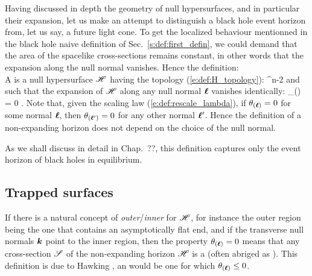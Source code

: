 {{Having discussed in depth the geometry of null hypersurfaces, and in particular
their expansion, let us make an attempt to distinguish a black hole event
horizon from, let us say, a future light cone.
To get the localized behaviour mentionned in the black hole naive definition
of Sec.~\ref{s:def:first_defin}, we could demand that the area of the
spacelike cross-sections remains constant, in other words that
the expansion along the null normal vanishes. Hence the definition:\\
A  is a null hypersurface $\mathscr{H}$ having the
topology (\ref{e:def:H_topology}):
\be
    \Hor \simeq \R \times {}^{n-2}
\ee
and such that the expansion of $\mathscr{H}$ along any null normal $\bm{\ell}$ vanishes
identically:
\be
    \theta_{(\wl)} = 0 .
\ee
Note that, given the scaling law (\ref{e:def:rescale_lambda}),
if $\theta_{(\bm{\ell})} = 0$ for some normal $\bm{\ell}$, then  $\theta_{(\bm{\ell}')} = 0$
for any other normal $\bm{\ell}'$. Hence the definition of a non-expanding horizon
does not depend on the choice of the null normal.

As we shall discuss in detail in Chap.~??, this definition captures only
the event horizon of black holes in equilibrium.

\subsection{Trapped surfaces}

If there is a natural concept of \emph{outer}/\emph{inner} for $\mathscr{H}$, for
instance the outer region being the one that contains an asymptotically flat end,
and if the transverse null normals $\bm{k}$ point to the inner region, then
the property $\theta_{(\bm{\ell})}=0$ means that any cross-section $\mathscr{S}$ of the
non-expanding horizon $\mathscr{H}$ is a
(often abriged as ). This definition is due to
Hawking \cite{Hawki73}, an
would be one for which $\theta_{(\bm{\ell})}\leq 0$.

}}
